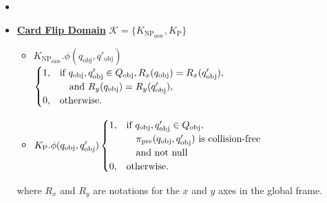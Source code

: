 \noindent\hrulefill



\begin{definition} \label{Def:phi_applicability}
\noindent\hrulefill
\normalfont

    
    

    \begin{itemize}
        \item[]
        \item \underline{\textbf{Card Flip Domain}} $\mathcal{K}=\{K_{\text{NP}_\text{slide}}, K_\text{P}\}$
            \begin{itemize}
                \item \(K_{\text{NP}_\text{slide}}.\phi(q_\text{obj}, q'_\text{obj})\) \\
                \(\begin{cases} 
                1, & \text{if } q_\text{obj}, q'_\text{obj} \in Q_\text{obj}, R_x(q_\text{obj}) =R_x(q'_\text{obj}), \\ 
                   & \quad \text{and } R_y(q_\text{obj}) = R_y(q'_\text{obj}), \\ 
                0, & \text{otherwise.} 
                \end{cases}\)
                \item \(K_\text{P}.\phi(q_\text{obj}, q'_\text{obj}) \\
                \begin{cases} 
                1, & \text{if } q_\text{obj}, q'_\text{obj} \in Q_\text{obj}, \\
                &\quad \pi_\text{pre}(q_\text{obj}, q'_\text{obj}) \text{ is collision-free} \\
                & \quad \text{and not null} \\ 
                0, & \text{otherwise.} 
                \end{cases}\)
            \end{itemize}
        where \( R_x \) and \( R_y \) are notations for the \( x \) and \( y \) axes in the global frame.


\end{itemize}
\end{definition}

